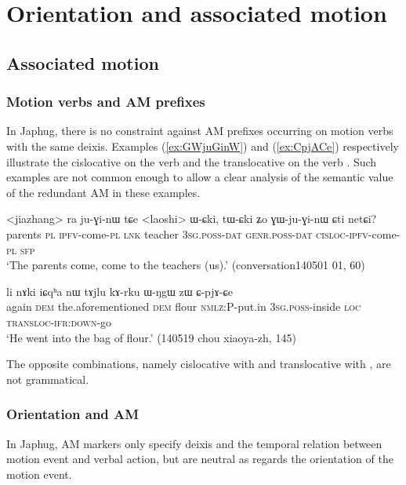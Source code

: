 \chapter{Orientation and associated motion}
\section{Associated motion}

\subsection{Motion verbs and AM prefixes}
In Japhug, there is no constraint against AM prefixes occurring on motion verbs with the same deixis. Examples (\ref{ex:GWjuGinW}) and (\ref{ex:CpjACe}) respectively illustrate the cislocative on the verb  and the translocative on the verb . Such examples are not common enough to allow a clear analysis of the semantic value of the redundant AM in these examples.

\begin{exe}
\ex \label{ex:GWjuGinW}
 \gll <jiazhang> ra ju-ɣi-nɯ tɕe <laoshi> ɯ-ɕki, tɯ-ɕki ʑo ɣɯ-ju-ɣi-nɯ ɕti netɕi? \\
 parents \textsc{pl} \textsc{ipfv}-come-\textsc{pl} \textsc{lnk} teacher \textsc{3sg}.\textsc{poss}-\textsc{dat} \textsc{genr}.\textsc{poss}-\textsc{dat} \textsc{cisloc}-\textsc{ipfv}-come-\textsc{pl} \textsc{sfp} \\
 \glt `The parents come, come to the teachers (us).' (conversation140501 01, 60)
\end{exe}

\begin{exe}
\ex \label{ex:CpjACe}
 \gll li nɤki iɕqʰa nɯ tɤjlu kɤ-rku ɯ-ŋgɯ zɯ ɕ-pjɤ-ɕe \\
 again \textsc{dem} the.aforementioned \textsc{dem} flour \textsc{nmlz}:P-put.in \textsc{3sg}.\textsc{poss}-inside \textsc{loc} \textsc{transloc}-\textsc{ifr}:\textsc{down}-go \\
 \glt `He went into the bag of flour.' (140519 chou xiaoya-zh, 145)
\end{exe}

The opposite combinations, namely cislocative with  and translocative with , are not grammatical. 

\subsection{Orientation and AM}
In Japhug, AM markers only specify deixis and the temporal relation between motion event and verbal action, but are neutral as regards the orientation of the motion event.


